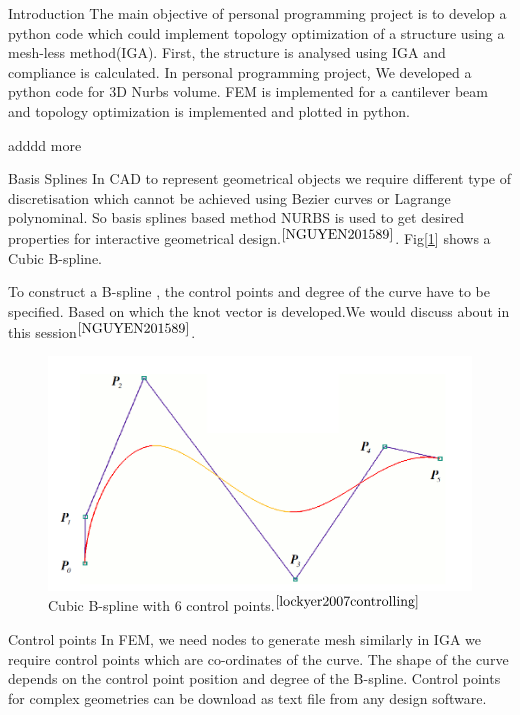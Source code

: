 \documentclass[a4paper,12pt,times]{article}
\begin{document}
\begin{section}{Introduction}
The main objective of personal programming project is to develop a python code which could implement topology optimization of a structure using a mesh-less method(IGA). First, the structure is analysed using IGA and compliance is calculated. 
In personal programming project, We developed a python code for 3D Nurbs volume. FEM is implemented for a cantilever beam and topology optimization is implemented and plotted in python.

adddd more

\end{section}

\begin{section}{Basis Splines}
In CAD to represent geometrical objects we require different type of discretisation which cannot be achieved using Bezier curves or Lagrange polynominal. So basis splines based method NURBS is used to get desired properties for interactive geometrical design.$^{\cite{NGUYEN201589}}$. Fig[\ref{fig:Cubic B-Spline}] shows a Cubic B-spline.

To construct a B-spline , the control points and degree of the curve have to be specified. Based on which the knot vector is developed.We would discuss about in this session$^{\cite{NGUYEN201589}}$. 


\begin{figure}[h!]
\centering
\includegraphics[width=0.75\linewidth]{Bsplines_figure1.png}
\caption{Cubic B-spline with 6 control points.$^{\cite{lockyer2007controlling}}$}
\label{fig:Cubic B-Spline}
\end{figure}

\begin{subsection}{Control points}
In FEM, we need nodes to generate mesh similarly in IGA we require control points which are co-ordinates of the curve. The shape of the curve depends on the control point position and degree of the B-spline. Control points for complex geometries can be download as text file from any design software. 
\end{subsection}


\end{section}
\end{document}
